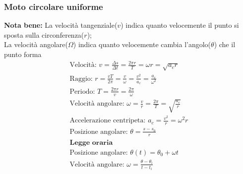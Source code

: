 \subsubsection{Moto circolare uniforme}
\textbf{Nota bene: } La velocità tangenziale($v$) indica quanto velocemente il punto si sposta sulla circonferenza($r$); \\
La velocità angolare($\Omega$) indica quanto velocemente cambia l'angolo($\theta$) che il punto forma
\begin{gather*}
\text{Velocità: } v = \frac{\Delta s}{\Delta t} = \frac{2 \pi r}{T} = \omega r = \sqrt{a_c r} \\
\text{Raggio: } r = \frac{v T}{2 \pi} = \frac{v}{\omega} = \frac{v^2}{a_c} = \frac{a_c}{\omega^2} \\
\text{Periodo: } T = \frac{2 \pi r}{v} = \frac{2 \pi}{\omega} \\
\text{Velocità angolare: } \omega = \frac{v}{r} = \frac{2 \pi}{T} = \sqrt{\frac{a_c}{r}} \\
\text{Accelerazione centripeta: } a_c = \frac{v^2}{r} = \omega^2 r \\
\text{Posizione angolare: } \theta = \frac{s - s_0}{r} \\
\textbf{Legge oraria} \\
\text{Posizione angolare: } \theta(t) = \theta_0 + \omega t \\
\text{Velocità angolare: } \omega = \frac{\theta - \theta_i}{t - t_i}
\end{gather*}
